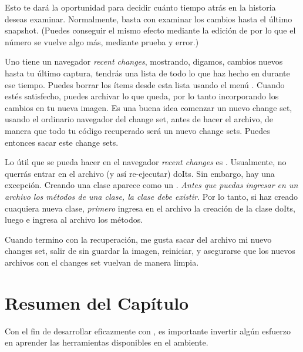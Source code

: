 \documentclass[spanish,a4paper,10pt,twoside]{book}
\begin{document}
Esto te dar\'a la oportunidad para decidir cu\'anto tiempo atr\'as en la historia deseas examinar. Normalmente, basta con examinar los cambios hasta el \'ultimo snapshot. (Puedes conseguir el mismo efecto mediante la edici\'on de  por lo que el n\'umero  se vuelve algo m\'as, mediante prueba y error.)

Uno tiene un navegador \emph{recent changes}, mostrando, digamos, cambios nuevos
hasta tu \'ultimo captura, tendr\'as una lista de todo lo que haz hecho en
\pharo durante ese tiempo. Puedes borrar los \'items desde esta lista usando el men\'u \actclick. Cuando est\'es satisfecho, puedes archivar lo que queda, por lo tanto incorporando los cambios en tu nueva imagen.
Es una buena idea comenzar un nuevo change set, usando el ordinario navegador del change set, antes de hacer el archivo, de manera que todo tu c\'odigo recuperado ser\'a un nuevo change sets.
Puedes entonces sacar este change sets.

Lo \'util que se pueda hacer en el navegador \emph{recent changes} es .
Usualmente, no querr\'as entrar en el archivo (y as\'i re-ejecutar) doIts.
Sin embargo, hay una excepci\'on.
Creando una clase aparece como un .
\emph{Antes que puedas ingresar en un archivo los m\'etodos de una clase, la clase debe existir.}
Por lo tanto, si haz creado cuaquiera nueva clase, \emph{primero} ingresa en el archivo la creaci\'on de la clase doIts, luego  e ingresa al archivo los m\'etodos.


Cuando termino con la recuperaci\'on, me gusta sacar del archivo mi nuevo changes set, salir de \pharo sin guardar la imagen, reiniciar, y asegurarse que los nuevos archivos con el changes set vuelvan de manera limpia.

\section{Resumen del Cap\'itulo}

Con el fin de desarrollar eficazmente con \pharo, es importante invertir alg\'un esfuerzo en aprender las herramientas disponibles en el ambiente.
\end{document}
